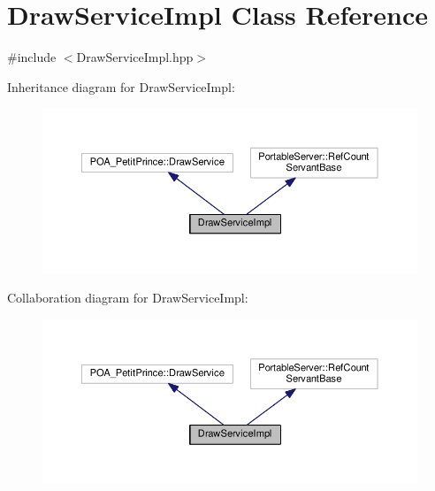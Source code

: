 \hypertarget{class_draw_service_impl}{}\section{Draw\+Service\+Impl Class Reference}
\label{class_draw_service_impl}


{\ttfamily \#include $<$Draw\+Service\+Impl.\+hpp$>$}



Inheritance diagram for Draw\+Service\+Impl\+:
\nopagebreak
\begin{figure}[H]
\begin{center}
\leavevmode
\includegraphics[width=350pt]{class_draw_service_impl__inherit__graph}
\end{center}
\end{figure}


Collaboration diagram for Draw\+Service\+Impl\+:
\nopagebreak
\begin{figure}[H]
\begin{center}
\leavevmode
\includegraphics[width=350pt]{class_draw_service_impl__coll__graph}
\end{center}
\end{figure}
